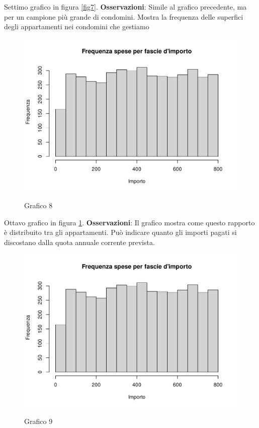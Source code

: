 Settimo grafico in figura \ref{fig7}. \textbf{Osservazioni}: Simile al grafico precedente, ma per un campione più grande di condomini. Mostra la frequenza delle superfici degli appartamenti nei condomini che gestiamo


\clearpage

\begin{figure}[t]
	\caption{Grafico 8}
	\includegraphics[page=8,width=\textwidth]{../R/grafici.pdf}
	\label{fig8}
\end{figure}

Ottavo grafico in figura \ref{fig8}. \textbf{Osservazioni}: Il grafico mostra come questo rapporto è distribuito tra gli appartamenti. Può indicare quanto gli importi pagati si discostano dalla quota annuale corrente prevista.

\clearpage

\begin{figure}[t]
	\caption{Grafico 9}
	\includegraphics[page=9,width=\textwidth]{../R/grafici.pdf}
	\label{fig9}
\end{figure}


